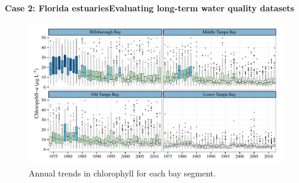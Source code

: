 \documentclass[serif]{beamer}\usepackage[]{graphicx}\usepackage[]{color}
\begin{document}
\begin{frame}{\textbf{Case 2: Florida estuaries}}{\textbf{Evaluating long-term water quality datasets}}
\begin{figure}[!ht]

{\centering \includegraphics[width=\linewidth]{fig/annual_chl-1} 

}

\caption[Annual trends in chlorophyll for each bay segment]{Annual trends in chlorophyll for each bay segment.}\label{fig:annual_chl}
\end{figure}


\end{frame}

\end{document}
